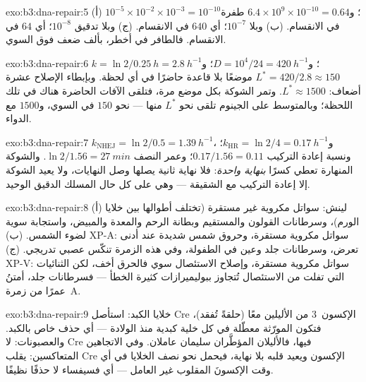 \begin{solution}{exo:b3:dna-repair:5}
(أ) $10^{-5}\times 10^{-2}\times 10^{-3} = 10^{-10}$؛ و$6.4\times
10^{9}\times 10^{-10} = 0.64$ طفرة في الانقسام. (ب) وبلا
 $10^{-7}$؛ أي $640$ في الانقسام. (ج) وبلا تدقيق
$10^{-8}$؛ أي $64$ في الانقسام. فالطافر في 
أخطر، بألف ضعف فوق السوي.
\end{solution}

\begin{solution}{exo:b3:dna-repair:6}
$k = \ln 2/\qty{0.25}{h} = \qty{2.8}{h^{-1}}$؛ و$D = 10^{4}/24 =
\qty{420}{h^{-1}}$؛ و$L^{*} = 420/2.8 \approx 150$ موضعًا بلا قاعدة
حاضرًا في أي لحظة. وبإبطاء الإصلاح عشرة أضعاف: $L^{*} \approx \num{1500}$.
وتمر الشوكة بكل موضع مرة، فتلقى الآفات الحاضرة هناك في
تلك اللحظة؛ وبالمتوسط على الجينوم تلقى نحو $L^{*}$ منها
--- نحو $150$ في السوي، و$\num{1500}$ مع الدواء.
\end{solution}

\begin{solution}{exo:b3:dna-repair:7}
$k_{\text{NHEJ}} = \ln 2/0.5 = \qty{1.39}{h^{-1}}$، و$k_{\text{HR}} =
\ln 2/4 = \qty{0.17}{h^{-1}}$؛ ونسبة إعادة التركيب $0.17/1.56 = 0.11$؛
وعمر النصف $\ln 2/1.56 = \qty{27}{min}$. والشوكة المنهارة تعطي
كسرًا \emph{بنهاية واحدة}: فلا نهاية ثانية يصلها وصل النهايات،
ولا يعيد الشوكة إلا إعادة التركيب مع الشقيقة --- وهي على كل حال
المسلك الدقيق الوحيد.
\end{solution}

\begin{solution}{exo:b3:dna-repair:8}
(أ) لينش: سواتل مكروية غير مستقرة (تختلف أطوالها بين خلايا
الورم)، وسرطانات القولون والمستقيم وبطانة الرحم والمعدة والمبيض،
واستجابة سوية لضوء الشمس. (ب) XP-A: سواتل مكروية مستقرة، وحروق شمس
شديدة عند أدنى تعرض، وسرطانات جلد وعين في الطفولة، وفي
هذه الزمرة تنكّس عصبي تدريجي. (ج) XP-V:
سواتل مكروية مستقرة، وإصلاح الاستئصال سوي فالحرق أخف،
لكن الثنائيات التي تفلت من الاستئصال تُتجاوز ببوليميرازات كثيرة
الخطأ --- فسرطانات جلد، أمتنُ عمرًا من زمرة~A.
\end{solution}

\begin{solution}{exo:b3:dna-repair:9}
خلايا الكبد: استأصل Cre الإكسون~3 من الأليلين معًا (حلقةً
تُفقد)، فتكون المورّثة معطّلة في كل خلية كبدية منذ الولادة
--- أي حذف خاص بالكبد. والعصبونات: لا Cre فيها، فالأليلان
المؤطَّران سليمان عاملان. وفي الاتجاهين المتعاكسين: يقلب Cre
الإكسون ويعيد قلبه بلا نهاية، فيحمل نحو نصف الخلايا في أي وقت
الإكسونَ المقلوب غير العامل --- أي فسيفساء لا حذفًا نظيفًا.
\end{solution}


